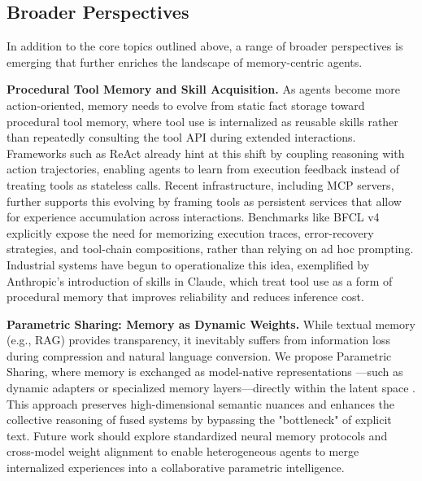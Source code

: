 \documentclass[manuscript,screen]{acmart}
\begin{document}
\subsection{Broader Perspectives}
In addition to the core topics outlined above, a range of broader perspectives is emerging that further enriches the landscape of memory-centric agents. 

\par{\textbf{Procedural Tool Memory and Skill Acquisition.}} As agents become more action-oriented, memory needs to evolve from static fact storage toward procedural tool memory, where tool use is internalized as reusable skills rather than repeatedly consulting the tool API during extended interactions. Frameworks such as ReAct \citep{yao2023react} already hint at this shift by coupling reasoning with action trajectories, enabling agents to learn from execution feedback instead of treating tools as stateless calls. Recent infrastructure, including MCP \citep{anthropic2024mcp} servers, further supports this evolving by framing tools as persistent services that allow for experience accumulation across interactions. Benchmarks like BFCL v4 \citep{patil2024berkeley} explicitly expose the need for memorizing execution traces, error-recovery strategies, and tool-chain compositions, rather than relying on ad hoc prompting. Industrial systems have begun to operationalize this idea, exemplified by Anthropic’s introduction of skills \citep{anthropic2025claudeskills} in Claude, which treat tool use as a form of procedural memory that improves reliability and reduces inference cost.

\par{\textbf{Parametric Sharing: Memory as Dynamic Weights.}} While textual memory (e.g., RAG) provides transparency, it inevitably suffers from information loss during compression and natural language conversion. We propose Parametric Sharing, where memory is exchanged as model-native representations \citep{berges2024memory}—such as dynamic adapters or specialized memory layers—directly within the latent space \citep{zou2025latentcollaboration}. This approach preserves high-dimensional semantic nuances and enhances the collective reasoning of fused systems by bypassing the "bottleneck" of explicit text. Future work should explore standardized neural memory protocols and cross-model weight alignment to enable heterogeneous agents to merge internalized experiences into a collaborative parametric intelligence.
\end{document}
